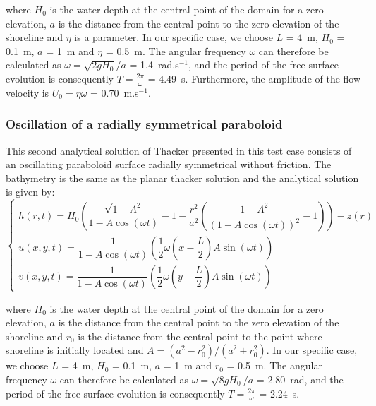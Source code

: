 where $H_0$ is the water depth at the central point of the domain for a zero
elevation, $a$ is the distance from the central
point to the zero elevation of the shoreline and $\eta$ is a parameter.
In our specific case, we choose $L$ = 4~m, $H_0$ = 0.1~m, $a$ = 1~m and $\eta$ = 0.5~m.
The angular frequency $\omega$ can therefore be calculated as
$\omega = \sqrt{2gH_0}/a$ = 1.4~rad.s$^{-1}$,
and the period of the free surface evolution is consequently
$T= \frac{2 \pi}{\omega}$ = 4.49~s.
Furthermore, the amplitude of the flow velocity is $U_0 = \eta \omega$ = 0.70~m.s$^{-1}$.\\

\subsubsection{Oscillation of a radially symmetrical paraboloid}

This second analytical solution of Thacker presented in this test case consists
of an oscillating paraboloid surface radially symmetrical without friction.
The bathymetry is the same as the planar thacker solution and
the analytical solution is given by:
\begin{equation}
  \left\{
    \begin{array}{ll}
      h(r,t) = H_0 \left( \dfrac{\sqrt{1- A^2}}{1-A\cos(\omega t)} - 1 - \dfrac{r^2}{a^2}\left(\dfrac{1-A^2}{(1-A\cos(\omega t))^2} -1 \right)\right) - z(r)\\
      u(x,y,t) = \dfrac{1}{1-A\cos(\omega t)} \left( \dfrac{1}{2} \omega \left( x - \dfrac{L}{2} \right) A \sin(\omega t )\right) \\
      v(x,y,t) = \dfrac{1}{1-A\cos(\omega t)} \left( \dfrac{1}{2} \omega \left( y - \dfrac{L}{2} \right) A \sin(\omega t )\right)
    \end{array}
    \right.
    \label{eq:thacker2:analytical}
\end{equation}

where $H_0$ is the water depth at the central point of the domain for a zero
elevation, $a$ is the distance from the central point to the zero elevation of
the shoreline and $r_0$ is the distance from the central point to the point
where shoreline is initially located and $A=(a^2-r_0^2)/(a^2+r_0^2)$.
In our specific case, we choose $L$ = 4~m, $H_0$ = 0.1~m, $a$ = 1~m and $r_0$
= 0.5~m.
The angular frequency $\omega$ can therefore be calculated as
$\omega = \sqrt{8gH_0}/a$ = 2.80~rad, and the period of the free surface evolution
is consequently $T= \frac{2 \pi}{\omega}$ = 2.24~s.


